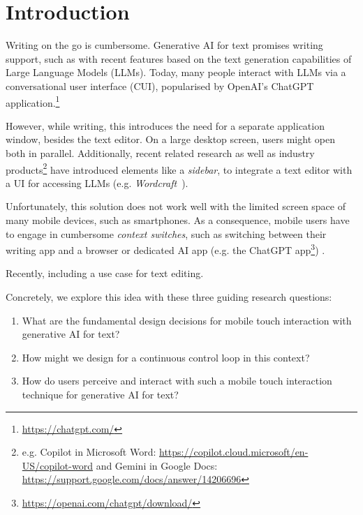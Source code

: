 \section{Introduction}
Writing on the go is cumbersome.
Generative AI for text promises writing support, such as with recent features based on the text generation capabilities of Large Language Models (LLMs).
Today, many people interact with LLMs via a conversational user interface (CUI), popularised by OpenAI's ChatGPT application.\footnote{\url{https://chatgpt.com/}}

However, while writing, this introduces the need for a separate application window, besides the text editor. 
On a large desktop screen, users might open both in parallel. Additionally, recent related research as well as industry products\footnote{e.g. Copilot in Microsoft Word: \url{https://copilot.cloud.microsoft/en-US/copilot-word} and Gemini in Google Docs: \url{https://support.google.com/docs/answer/14206696}} have introduced elements like a \textit{sidebar}, to integrate a text editor with a UI for accessing LLMs (e.g. \textit{Wordcraft}~\cite{Yuan20222wordcraft}).

Unfortunately, this solution does not work well with the limited screen space of many mobile devices, such as smartphones. 
As a consequence, mobile users have to engage in cumbersome \textit{context switches}, such as switching between their writing app and a browser or dedicated AI app (e.g. the ChatGPT app\footnote{\url{https://openai.com/chatgpt/download/}}) .


Recently, \citet{directGPT}  including a use case for text editing.



Concretely, we explore this idea with these three guiding research questions:

\begin{enumerate}
    \item What are the fundamental design decisions for mobile touch interaction with generative AI for text?
    \item How might we design for a continuous control loop in this context?
    \item How do users perceive and interact with such a mobile touch interaction technique for generative AI for text?
\end{enumerate}


